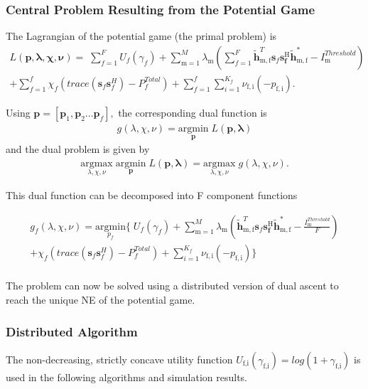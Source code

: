 \documentclass[12pt,a4paper]{report}
\begin{document}
\subsubsection{Central Problem Resulting from the Potential Game}
The Lagrangian of the potential game (the primal problem) is
\begin{multline}
L(\mathbf{\mathbf{p},\lambda,\chi,\nu}) = 
\;
\sum_{f=1}^F U_{f}(\gamma_{f}) 
+
\sum_{\mathrm{m=1}}^M \lambda_{\mathrm{m}}
(	  \sum^F_{f=1} \mathbf{\tilde{h}}_{\mathrm{m,f}}^T  \mathbf{s}_{f} 						
	\mathbf{s_{f}^{\mathrm{H}}} \mathbf{\tilde{h}_{\mathrm{m,f}}^*} - I^{Threshold}		
	_{\mathrm{m}} )
\\
+ 
\sum_{f=1}^f
\chi_{f}(trace(\mathbf{s}_f\mathbf{s}_f^H)-P^{Total}_{f} )
+
\sum_{f=1}^f
\sum_{i=1}^{K_{f}}
\nu_{\mathrm{f,i}}(-p_{\mathrm{f,i}}).
\end{multline}

Using $\mathbf{p}= [\mathbf{p}_1, \mathbf{p}_2...\mathbf{p}_{f}],$ the corresponding dual function is
\begin{gather*}
g(\lambda, \chi, \nu) = \underset{\mathbf{p}}{\mathrm{argmin}}\;L(\mathbf{\mathbf{p},\lambda})
\end{gather*}
and the dual problem is given by
\begin{gather*}
\underset{\lambda, \chi, \nu}{\mathrm{argmax}}\;\underset{\mathbf{p}}{\mathrm{argmin}}\;L(\mathbf{\mathbf{p},\lambda}) = \underset{\lambda, \chi, \nu}{\mathrm{argmax}}\;g(\lambda, \chi, \nu).
\end{gather*}

This dual function can be decomposed into F component functions


\begin{multline}
g_f(\lambda, \chi, \nu) = \underset{p_{f}}{\mathrm{argmin}}
\{
\;
U_{f}(\gamma_{f}) 
+
\sum_{\mathrm{m=1}}^M \lambda_{\mathrm{m}}
(\mathbf{\tilde{h}}_{\mathrm{m,f}}^T  \mathbf{s}_{f} 						
	\mathbf{s_{f}^{\mathrm{H}}} \mathbf{\tilde{h}_{\mathrm{m,f}}^*} - \frac{I^{Threshold}_{\mathrm{m}}}{F})
\\
+ 
\chi_{f}(trace(\mathbf{s}_f\mathbf{s}_f^H)-P^{Total}_{f} )
+
\sum_{i=1}^{K_f}
\nu_{\mathrm{f,i}}(-p_{\mathrm{f,i}})\}
\end{multline}
\\

The problem can now be solved using a distributed version of dual ascent to reach the unique NE of the potential game. 
\subsubsection{Distributed Algorithm}\label{algo1}
The non-decreasing, strictly concave utility function $U_{\text{f,i}}(\gamma_{\text{f,i}}) = log(1+\gamma_{\text{f,i}})$ 
is used in the following algorithms and simulation results.
\end{document}
